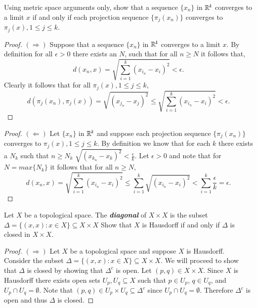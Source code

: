 \documentclass[minion]{homework651}
\begin{document}
\begin{problems}
\problem Using metric space arguments only, show that a sequence $\{x_n\}$ in $\mathbb R^k$ converges to a limit
$x$ if and only if each projection sequence $\{\pi_j(x_n)\}$ converges to $\pi_j(x), 1 \leq j \leq k$. 
\begin{proof}$(\Rightarrow)$ Suppose that a sequence $\{x_n\}$ in $\mathbb R^k$ converges to a limit $x$. By definition for all $\epsilon > 0$
    there exists an $N$, such that for all $n \geq N$ it follows that, 
    \begin{equation*}
       d(x_n, x) = \sqrt{\sum_{i = 1}^k(x_{i_n} - x_i)^2} < \epsilon.
    \end{equation*}
    Clearly it follows that for all $\pi_j(x), 1 \leq j \leq k$, 
    \begin{equation*}
        d(\pi_j(x_n), \pi_j(x)) = \sqrt{(x_{j_n} - x_j)^2} \leq \sqrt{\sum_{i = 1}^k(x_{i_n} - x_i)^2} < \epsilon.
    \end{equation*}
\end{proof}


\begin{proof}$(\Leftarrow)$ Let $\{x_n\}$ in $\mathbb R^k$ and suppose each projection sequence $\{\pi_j(x_n)\}$ converges to $\pi_j(x), 1 \leq j \leq k$. 
    By definition we know that for each $k$ there exists a $N_k$ such that $n \geq N_k$ $\sqrt{(x_{k_n} - x_k)^2} < \frac{\epsilon}{k}$.
    Let $\epsilon > 0$ and note that for $N = max\{N_k\}$ it follows that for all $n \geq N$,
    \begin{equation*}
        d(x_n, x) = \sqrt{\sum_{i = 1}^k(x_{i_n} - x_i)^2} \leq \sum_{i = 1}^k \sqrt{(x_{i_n} - x_i)^2} < \sum_{i = 1}^k \frac{\epsilon}{k}  = \epsilon. 
    \end{equation*}

\end{proof}

\problem Let $X$ be a topological space. The \textbf{\emph{diagonal}} of $X \times X$ is the subset $\Delta = \{(x, x): x \in X\}\subseteq X \times X$
Show that $X$ is Hausdorff if and only if $\Delta$ is closed in $X \times X$. 
\begin{proof} $(\Rightarrow)$ Let $X$ be a topological space and suppose $X$ is Hausdorff. Consider the subset $\Delta = \{(x, x): x \in X\}\subseteq X \times X$. We will proceed to show that $\Delta$ is closed by showing that $\Delta^c$ is open. Let $(p,q) \in X \times X$. Since $X$ is Hausdorff there exists open sets $U_p, U_q \subseteq X$ such that $p \in U_p$, $q \in U_q$, and $U_p \cap U_q = \emptyset$. Note that $(p, q) \in U_p\times U_q \subseteq \Delta^c$ since $U_p \cap U_q = \emptyset$. Therefore $\Delta^c$ is open and thus $\Delta$ is closed.  
\end{proof}



\end{problems}
\end{document}
